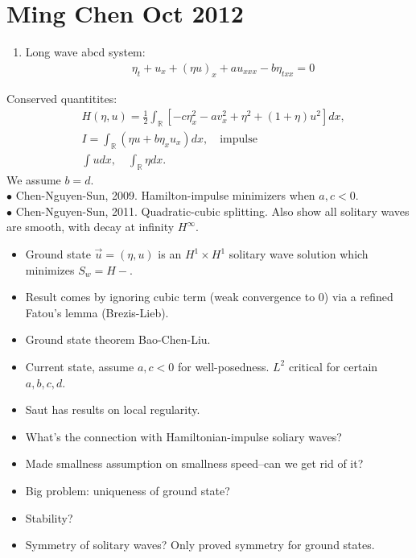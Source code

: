 \documentclass[12pt,reqno]{amsart}
\numberwithin{equation}{section}  %
\newcommand{\rr}{\mathbb{R}}
\begin{document}
\section{Ming Chen Oct 2012}
\begin{enumerate}
    \item{}
	Long wave abcd system:
	\begin{equation*}
	    \begin{split}
		& \eta_{t} + u_{x} + (\eta u)_{x} + au_{xxx} - b\eta_{txx} =0
	    \end{split}
	\end{equation*}
\end{enumerate}
Conserved quantitites:
\begin{equation*}
    \begin{split}
	& H(\eta, u) = \frac{1}{2} \int_{\rr}[-c \eta_{x}^{2} - av_{x}^{2} + \eta^{2} + (1 + \eta)u^{2}] dx,
	\\
	& I = \int_{\rr} (\eta u + b \eta_{x} u_{x}) dx, \quad \text{impulse}
	\\
	& \int u dx, \quad \int_{\rr} \eta dx.
    \end{split}
\end{equation*}
We assume $b = d$.
\\
$\bullet$ Chen-Nguyen-Sun, 2009. Hamilton-impulse minimizers when $a,c<0$.
\\
$\bullet$ Chen-Nguyen-Sun, 2011. Quadratic-cubic splitting. Also show all solitary waves are smooth, with decay at infinity $H^{\infty}$.
\begin{itemize}
    \item
	Ground state $\vec{u} = (\eta, u)$  is an $H^{1} \times H^{1}$ solitary wave solution which minimizes $S_{w} = H - $.
    \item
	Result comes by ignoring cubic term (weak convergence to 0) via a refined Fatou's lemma (Brezis-Lieb).
    \item Ground state theorem Bao-Chen-Liu.
    \item{}
	Current state, assume $a, c < 0$ for well-posedness. $L^{2}$ critical for certain $a,b,c,d$.
    \item{}
	Saut has results on local regularity.
\end{itemize}
\begin{itemize}
    \item{}
	What's the connection with Hamiltonian-impulse soliary waves?
    \item{}
	Made smallness assumption on smallness speed--can we get rid of it?
    \item{}
	Big problem: uniqueness of ground state?
    \item{}
	Stability?
    \item{}
	Symmetry of solitary waves? Only proved symmetry for ground states.
\end{itemize}
\end{document}
